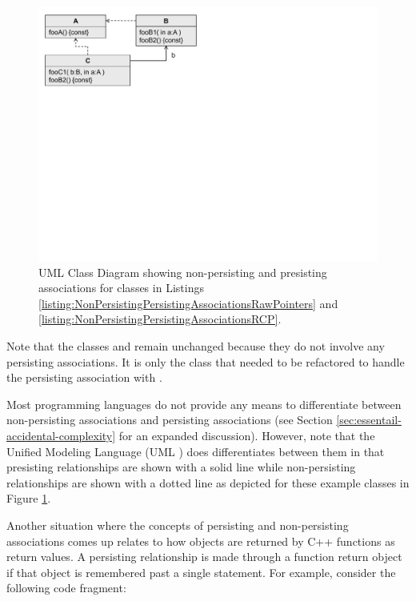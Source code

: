\documentclass[pdf,ps2pdf,11pt]{SANDreport}
\begin{document}
{\bsinglespace
\begin{figure}
\begin{center}
\includegraphics*[angle=0,scale=0.65]{UML_A_B_C}
\end{center}
\caption[UML Class Diagram showing non-persisting and presisting associations]{
\label{fig:UML_A_B_C}
UML Class Diagram showing non-persisting and presisting associations
for classes in Listings
{}\ref{listing:NonPersistingPersistingAssociationsRawPointers} and
{}\ref{listing:NonPersistingPersistingAssociationsRCP}.}
\end{figure}
\esinglespace}


Note that the classes {} and {} remain unchanged because they do
not involve any persisting associations.  It is only the class {} that
needed to be refactored to handle the persisting association with {}.

Most programming languages do not provide any means to differentiate
between non-persisting associations and persisting associations (see
Section {}\ref{sec:essentail-accidental-complexity} for an expanded
discussion).  However, note that the Unified Modeling Language (UML
{}\cite{UMLDistilledThirdEdition04}) does differentiates between them
in that presisting relationships are shown with a solid line while
non-persisting relationships are shown with a dotted line as depicted
for these example classes in Figure {}\ref{fig:UML_A_B_C}.

Another situation where the concepts of persisting and non-persisting
associations comes up relates to how objects are returned by C++ functions as
return values.  A persisting relationship is made through a function return
object if that object is remembered past a single statement.  For example,
consider the following code fragment:
\end{document}
